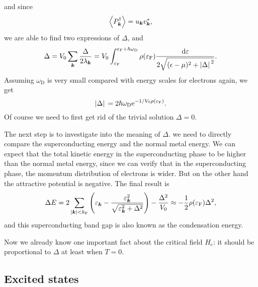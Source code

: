 \documentclass[hyperref, a4paper]{article}
\newcommand*{\ee}{\mathrm{e}}
\begin{document}
and since 
\begin{equation}
    \expval{P^\dagger_{\vb*{k}}} = u_{\vb*{k}} v^*_{\vb*{k}},
\end{equation}
we are able to find two expressions of $\Delta$, and 
\begin{equation}
    \Delta = V_0 \sum_{\vb*{k}} \frac{\Delta}{2 \lambda_{\vb*{k}}}
    = V_0 \int_{\varepsilon_{\text{F}}}^{\varepsilon_{\text{F}} + \hbar \omega_{\text{D}}} 
    \rho(\varepsilon_{\text{F}}) \frac{\dd{\varepsilon}}{2 \sqrt{(\epsilon - \mu)^2 + \abs*{\Delta}^2} }.
\end{equation}
Assuming $\omega_{\text{D}}$ is very small compared with 
energy scales for electrons again, 
we get 
\begin{equation}
    \abs*{\Delta} = 2 \hbar \omega_{\text{D}} \ee^{- 1 / V_0 \rho(\varepsilon_{\text{F}})}.
\end{equation}
Of course we need to first get rid of the trivial solution $\Delta = 0$.

The next step is to investigate into the meaning of $\Delta$.
we need to directly compare the superconducting energy 
and the normal metal energy.
We can expect that the total kinetic energy in the superconducting phase 
to be higher than the normal metal energy,
since we can verify that in the superconducting phase, 
the momentum distribution of electrons is wider.
But on the other hand the attractive potential is negative.
The final result is 
\begin{equation}
    \Delta E = 2 \sum_{\abs*{\vb*{k}} < k_{\text{F}}} \left(
        \varepsilon_{\vb*{k}} - \frac{\varepsilon_{\vb*{k}}^2}{\sqrt{\varepsilon_{\vb*{k}}^2 + \Delta^2}}
    \right) - \frac{\Delta^2}{V_0}
    \approx - \frac{1}{2} \rho(\varepsilon_{\text{F}}) \Delta^2 ,
\end{equation}
and this superconducting band gap is also known as the condensation energy.

Now we already know one important fact about the critical field $H_{\text{c}}$:
it should be proportional to $\Delta$ at least when $T = 0$.

\subsection{Excited states}
\end{document}
